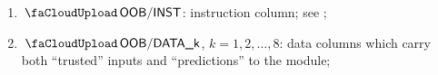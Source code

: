 \begin{enumerate}[resume]
	\item $\miscOobInst$:
		\oobMod{} instruction column; see ;
	\item $\miscOobDataCol{k}$, $k=1, 2, \dots, 8$:
		data columns which carry both ``trusted'' inputs and ``predictions'' to the \oobMod{} module;
\end{enumerate}
